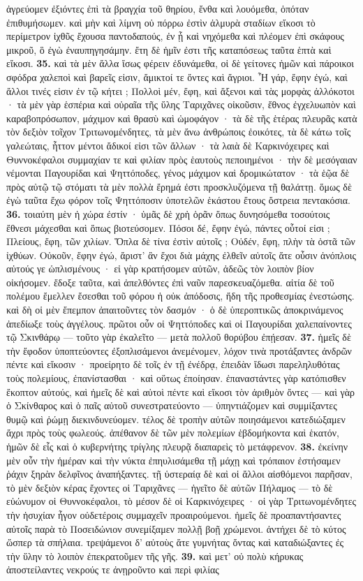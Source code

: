 \documentclass[a4paper, 11pt, oneside, polutonikogreek, german]{article}
\begin{document}
ἀγρεύομεν ἐξιόντες ἐπὶ τὰ βραγχία τοῦ θηρίου, ἔνθα καὶ λουόμεθα, ὁπόταν ἐπιθυμήσωμεν. καὶ μὴν καὶ λίμνη οὐ πόρρω ἐστὶν ἁλμυρὰ σταδίων εἴκοσι τὸ περίμετρον ἰχθῦς ἔχουσα παντοδαπούς, ἐν ᾗ καὶ νηχόμεθα καὶ πλέομεν ἐπὶ σκάφους μικροῦ, ὃ ἐγὼ ἐναυπηγησάμην. ἔτη δὲ ἡμῖν ἐστι τῆς καταπόσεως ταῦτα ἑπτὰ καὶ εἴκοσι. \textbf{35.} καὶ τὰ μὲν ἄλλα ἴσως φέρειν ἐδυνάμεθα, οἱ δὲ γείτονες ἡμῶν καὶ πάροικοι σφόδρα χαλεποὶ καὶ βαρεῖς εἰσιν, ἄμικτοί τε ὄντες καὶ ἄγριοι. Ἦ γάρ, ἔφην ἐγώ, καὶ ἄλλοι τινές εἰσιν ἐν τῷ κήτει ; Πολλοὶ μέν, ἔφη, καὶ ἄξενοι καὶ τὰς μορφὰς ἀλλόκοτοι · τὰ μὲν γὰρ ἑσπέρια καὶ οὐραῖα τῆς ὕλης Ταριχᾶνες οἰκοῦσιν, ἔθνος ἐγχελυωπὸν καὶ καραβοπρόσωπον, μάχιμον καὶ θρασὺ καὶ ὠμοφάγον · τὰ δὲ τῆς ἑτέρας πλευρᾶς κατὰ τὸν δεξιὸν τοῖχον Τριτωνομένδητες, τὰ μὲν ἄνω ἀνθρώποις ἐοικότες, τὰ δὲ κάτω τοῖς γαλεώταις, ἧττον μέντοι ἄδικοί εἰσι τῶν ἄλλων · τὰ λαιὰ δὲ Καρκινόχειρες καὶ Θυννοκέφαλοι συμμαχίαν τε καὶ φιλίαν πρὸς ἑαυτοὺς πεποιημένοι · τὴν δὲ μεσόγαιαν νέμονται Παγουρίδαι καὶ Ψηττόποδες, γένος μάχιμον καὶ δρομικώτατον · τὰ ἑῷα δὲ πρὸς αὐτῷ τῷ στόματι τὰ μὲν πολλὰ ἔρημά ἐστι προσκλυζόμενα τῇ θαλάττῃ. ὅμως δὲ ἐγὼ ταῦτα ἔχω φόρον τοῖς Ψηττόποσιν ὑποτελῶν ἑκάστου ἔτους ὄστρεια πεντακόσια. \textbf{36.} τοιαύτη μὲν ἡ χώρα ἐστίν · ὑμᾶς δὲ χρὴ ὁρᾶν ὅπως δυνησόμεθα τοσούτοις ἔθνεσι μάχεσθαι καὶ ὅπως βιοτεύσομεν. Πόσοι δέ, ἔφην ἐγώ, πάντες οὗτοί εἰσι ; Πλείους, ἔφη, τῶν χιλίων. Ὅπλα δὲ τίνα ἐστὶν αὐτοῖς ; Οὐδέν, ἔφη, πλὴν τὰ ὀστᾶ τῶν ἰχθύων. Οὐκοῦν, ἔφην ἐγώ, ἄριστ' ἂν ἔχοι διὰ μάχης ἐλθεῖν αὐτοῖς ἅτε οὖσιν ἀνόπλοις αὑτούς γε ὡπλισμένους · εἰ γὰρ κρατήσομεν αὐτῶν, ἀδεῶς τὸν λοιπὸν βίον οἰκήσομεν. ἔδοξε ταῦτα, καὶ ἀπελθόντες ἐπὶ ναῦν παρεσκευαζόμεθα. αἰτία δὲ τοῦ πολέμου ἔμελλεν ἔσεσθαι τοῦ φόρου ἡ οὐκ ἀπόδοσις, ἤδη τῆς προθεσμίας ἐνεστώσης. καὶ δὴ οἱ μὲν ἔπεμπον ἀπαιτοῦντες τὸν δασμόν · ὁ δὲ ὑπεροπτικῶς ἀποκρινάμενος ἀπεδίωξε τοὺς ἀγγέλους. πρῶτοι οὖν οἱ Ψηττόποδες καὶ οἱ Παγουρίδαι χαλεπαίνοντες τῷ Σκινθάρῳ --- τοῦτο γὰρ ἐκαλεῖτο --- μετὰ πολλοῦ θορύβου ἐπῄεσαν. \textbf{37.} ἡμεῖς δὲ τὴν ἔφοδον ὑποπτεύοντες ἐξοπλισάμενοι ἀνεμένομεν, λόχον τινὰ προτάξαντες ἀνδρῶν πέντε καὶ εἴκοσιν · προείρητο δὲ τοῖς ἐν τῇ ἐνέδρᾳ, ἐπειδὰν ἴδωσι παρεληλυθότας τοὺς πολεμίους, ἐπανίστασθαι · καὶ οὕτως ἐποίησαν. ἐπαναστάντες γὰρ κατόπισθεν ἔκοπτον αὐτούς, καὶ ἡμεῖς δὲ καὶ αὐτοὶ πέντε καὶ εἴκοσι τὸν ἀριθμὸν ὄντες --- καὶ γὰρ ὁ Σκίνθαρος καὶ ὁ παῖς αὐτοῦ συνεστρατεύοντο --- ὑπηντιάζομεν καὶ συμμίξαντες θυμῷ καὶ ῥώμῃ διεκινδυνεύομεν. τέλος δὲ τροπὴν αὐτῶν ποιησάμενοι κατεδιώξαμεν ἄχρι πρὸς τοὺς φωλεούς. ἀπέθανον δὲ τῶν μὲν πολεμίων ἑβδομήκοντα καὶ ἑκατόν, ἡμῶν δὲ εἷς καὶ ὁ κυβερνήτης τρίγλης πλευρᾷ διαπαρεὶς τὸ μετάφρενον. \textbf{38.} ἐκείνην μὲν οὖν τὴν ἡμέραν καὶ τὴν νύκτα ἐπηυλισάμεθα τῇ μάχῃ καὶ τρόπαιον ἐστήσαμεν ῥάχιν ξηρὰν δελφῖνος ἀναπήξαντες. τῇ ὑστεραίᾳ δὲ καὶ οἱ ἄλλοι αἰσθόμενοι παρῆσαν, τὸ μὲν δεξιὸν κέρας ἔχοντες οἱ Ταριχᾶνες --- ἡγεῖτο δὲ αὐτῶν Πήλαμος --- τὸ δὲ εὐώνυμον οἱ Θυννοκέφαλοι, τὸ μέσον δὲ οἱ Καρκινόχειρες · οἱ γὰρ Τριτωνομένδητες τὴν ἡσυχίαν ἦγον οὐδετέροις συμμαχεῖν προαιρούμενοι. ἡμεῖς δὲ προαπαντήσαντες αὐτοῖς παρὰ τὸ Ποσειδώνιον συνεμίξαμεν πολλῇ βοῇ χρώμενοι. ἀντήχει δὲ τὸ κύτος ὥσπερ τὰ σπήλαια. τρεψάμενοι δ' αὐτοὺς ἅτε γυμνήτας ὄντας καὶ καταδιώξαντες ἐς τὴν ὕλην τὸ λοιπὸν ἐπεκρατοῦμεν τῆς γῆς. \textbf{39.} καὶ μετ' οὐ πολὺ κήρυκας ἀποστείλαντες νεκρούς τε ἀνῃροῦντο καὶ περὶ φιλίας 
\end{document}
